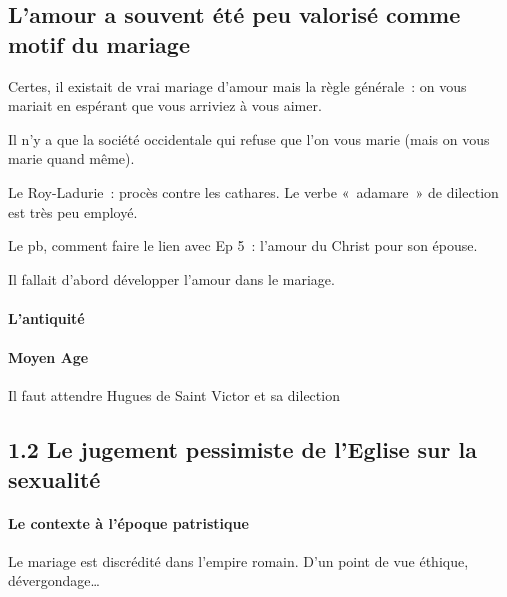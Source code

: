 \hypertarget{lamour-a-souvent-uxe9tuxe9-peu-valorisuxe9-comme-motif-du-mariage}{%
\subsection{L'amour a souvent été peu valorisé comme motif du
mariage}\label{lamour-a-souvent-uxe9tuxe9-peu-valorisuxe9-comme-motif-du-mariage}}

Certes, il existait de vrai mariage d'amour mais la règle générale~: on
vous mariait en espérant que vous arriviez à vous aimer.

Il n'y a que la société occidentale qui refuse que l'on vous marie (mais
on vous marie quand même).

Le Roy-Ladurie~: procès contre les cathares. Le verbe «~adamare~» de
dilection est très peu employé.

Le pb, comment faire le lien avec Ep 5~: l'amour du Christ pour son
épouse.

Il fallait d'abord développer l'amour dans le mariage.

\hypertarget{lantiquituxe9}{%
\paragraph{L'antiquité}\label{lantiquituxe9}}

\hypertarget{moyen-age}{%
\paragraph{Moyen Age}\label{moyen-age}}

Il faut attendre Hugues de Saint Victor et sa dilection

\hypertarget{le-jugement-pessimiste-de-leglise-sur-la-sexualituxe9}{%
\subsection{1.2 Le jugement pessimiste de l'Eglise sur la
sexualité}\label{le-jugement-pessimiste-de-leglise-sur-la-sexualituxe9}}

\hypertarget{le-contexte-uxe0-luxe9poque-patristique}{%
\paragraph{Le contexte à l'époque
patristique}\label{le-contexte-uxe0-luxe9poque-patristique}}

Le mariage est discrédité dans l'empire romain. D'un point de vue
éthique, dévergondage\ldots{}

